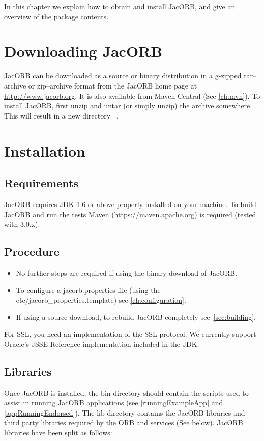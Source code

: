 
In this chapter  we explain how to obtain and  install JacORB, and give
an overview of the package contents.

\section{Downloading JacORB}

JacORB can be downloaded as a source or binary distribution in a g-zipped
tar--archive or zip--archive format from the JacORB home page at
\href{http://www.jacorb.org}{http://www.jacorb.org}. It is also available from
Maven Central (See \ref{ch:mvn}). To install JacORB, first unzip and untar (or
simply unzip) the archive somewhere.  This will result in a new directory {\tt
\JacORBDir}.

\section{Installation}
\label{Sec_installation}

\subsection{Requirements}

JacORB requires JDK 1.6 or above properly installed on your machine. To build
JacORB and run the tests Maven (\href{https://maven.apache.org}{https://maven.apache.org})
 is required (tested with 3.0.x).

\subsection{Procedure}
\begin{itemize}
\item No further steps are required if using the binary download of JacORB.
\item To configure a jacorb.properties file (using the etc/jacorb\_properties.template) see \ref{ch:configuration}.
\item If using a source download, to rebuild JacORB completely see~\ref{sec:building}.
\end{itemize}

For SSL, you need an implementation of the SSL protocol. We currently support
Oracle's JSSE Reference implementation included in the JDK.

\subsection{Libraries}
Once JacORB is installed, the bin directory should contain the scripts used to assist in
running JacORB applications (see \ref{runningExampleApp} and \ref{appRunningEndorsed}).
The lib directory contains the JacORB libraries and third party libraries required by the ORB
and services (See below). JacORB libraries have been split as follows:

